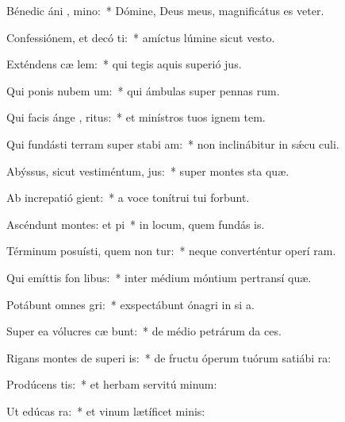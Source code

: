 \item Bénedic áni , mino:~* Dómine, Deus meus, magnificátus es veter.
\item Confessiónem, et decó ti:~* amíctus lúmine sicut vesto.
\item Exténdens cæ  lem:~* qui tegis aquis superió jus.
\item Qui ponis nubem  um:~* qui ámbulas super pennas rum.
\item Qui facis ánge , ritus:~* et minístros tuos ignem tem.
\item Qui fundásti terram super stabi am:~* non inclinábitur in sǽcu culi.
\item Abýssus, sicut vestiméntum,  jus:~* super montes sta quæ.
\item Ab increpatió  gient:~* a voce tonítrui tui forbunt.
\item Ascéndunt montes: et  pi~* in locum, quem fundás is.
\item Términum posuísti, quem non tur:~* neque converténtur operí ram.
\item Qui emíttis fon  libus:~* inter médium móntium pertransí quæ.
\item Potábunt omnes  gri:~* exspectábunt ónagri in si a.
\item Super ea vólucres cæ bunt:~* de médio petrárum da ces.
\item Rigans montes de superi is:~* de fructu óperum tuórum satiábi ra:
\item Prodúcens  tis:~* et herbam servitú minum:
\item Ut edúcas   ra:~* et vinum lætíficet  minis:
